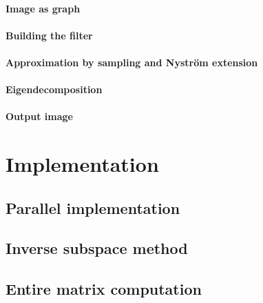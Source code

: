 \documentclass[]{article}
\begin{document}
\paragraph{Image as graph}


\paragraph{Building the filter}


\paragraph{Approximation by sampling and Nystr\"om extension}


\paragraph{Eigendecomposition}


\paragraph{}


\paragraph{Output image}


\section{Implementation}

\subsection{Parallel implementation}


\subsection{Inverse subspace method}


\subsection{Entire matrix computation}

\end{document}
